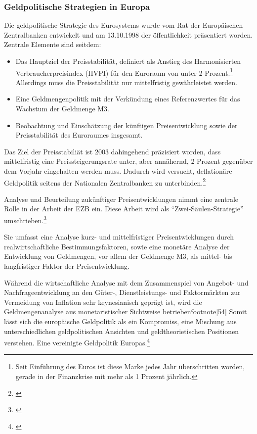 \documentclass[
        onecolumn,
        a4paper,
        abstracton,
        parskip=half
        ,final
        ]{scrartcl}
\begin{document}
\subsubsection{Geldpolitische Strategien in Europa}

Die geldpolitische Strategie des Eurosystems wurde vom Rat der Europ{\"a}ischen Zentralbanken entwickelt und am 13.10.1998 der {\"o}ffentlichkeit pr{\"a}sentiert worden.
Zentrale Elemente sind seitdem:
\begin{itemize}
 \item Das Hauptziel der Preisstabilit{\"a}t, definiert als Anstieg des Harmonisierten Verbraucherpreisindex (HVPI) f{\"u}r den Euroraum von unter 2 Prozent.\footnote[51]{Seit Einf{\"u}hrung des Euros ist diese Marke  jedes Jahr {\"u}berschritten worden, gerade in der Finanzkrise mit mehr als 1 Prozent j{\"a}hrlich.} Allerdings muss die Preisstabilit{\"a}t nur mittelfristig gew{\"a}hrleistet werden.
 \item Eine Geldmengenpolitik mit der Verk{\"u}ndung eines Referenzwertes f{\"u}r das Wachstum der Geldmenge M3.
 \item Beobachtung und Einsch{\"a}tzung der k{\"u}nftigen Preisentwicklung sowie der Preisstabilit{\"a}t des Euroraumes insgesamt.
\end{itemize}

Das Ziel der Preisstabili{\"a}t ist 2003 dahingehend pr{\"a}zisiert worden, dass mittelfristig eine Preissteigerungsrate unter, aber ann{\"a}hernd, 2 Prozent gegen{\"u}ber dem Vorjahr eingehalten werden muss. Dadurch wird versucht, deflation{\"a}re Geldpolitik seitens der Nationalen Zentralbanken zu unterbinden.\footnote[52]{\citep*[vgl.][S.564-568]{Basseler2010}}

Analyse und Beurteilung zuk{\"u}nftiger Preisentwicklungen nimmt eine zentrale Rolle in der Arbeit der EZB ein. Diese Arbeit wird als  "`Zwei-S{\"a}ulen-Strategie"' umschrieben.\footnote[53]{\citep*[S.568]{Basseler2010}}

Sie umfasst eine Analyse kurz- und mittelfristiger Preisentwicklungen durch realwirtschaftliche Bestimmungsfaktoren, sowie eine monet{\"a}re Analyse der Entwicklung von Geldmengen, vor allem der Geldmenge M3, als mittel- bis langfristiger Faktor der Preisentwicklung.

W{\"a}hrend die wirtschaftliche Analyse mit dem Zusammenspiel von Angebot- und Nachfrageentwicklung an den G{\"u}ter-, Dienstleistungs- und Faktorm{\"a}rkten zur Vermeidung von Inflation sehr keynesianisch gepr{\"a}gt ist, wird die Geldmengenanalyse aus monetaristischer Sichtweise betrieben\.footnote[54]{\citep*[S.568]{Basseler2010}} Somit l{\"a}sst sich die europ{\"a}ische Geldpolitik als ein Kompromiss, eine Mischung aus unterschiedlichen geldpolitischen Ansichten und geldtheorietischen Positionen verstehen. Eine vereinigte Geldpolitik Europas.\footnote[55]{\citep*[vgl.][S.558f]{Basseler2010}}
\end{document}
